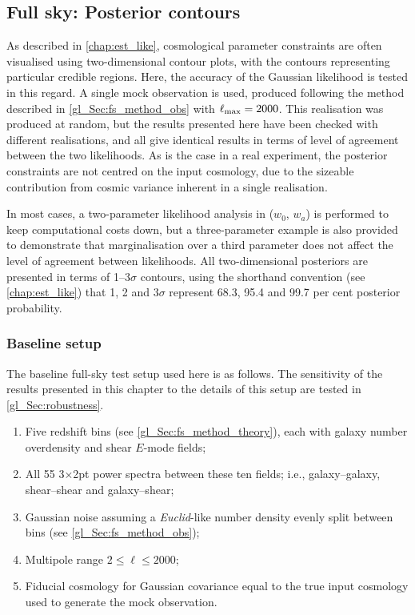 \subsection{Full sky: Posterior contours}
\label{gl_Sec:fs_contours}

As described in \autoref{chap:est_like}, cosmological parameter constraints are often visualised using two-dimensional contour plots, with the contours representing particular credible regions. Here, the accuracy of the Gaussian likelihood is tested in this regard. A single mock observation is used, produced following the method described in \autoref{gl_Sec:fs_method_obs} with $\ell_\text{max} = 2000$. This realisation was produced at random, but the results presented here have been checked with different realisations, and all give identical results in terms of level of agreement between the two likelihoods. As is the case in a real experiment, the posterior constraints are not centred on the input cosmology, due to the sizeable contribution from cosmic variance inherent in a single realisation.

In most cases, a two-parameter likelihood analysis in ($w_0$, $w_a$) is performed to keep computational costs down, but a three-parameter example is also provided to demonstrate that marginalisation over a third parameter does not affect the level of agreement between likelihoods. All two-dimensional posteriors are presented in terms of 1--3$\sigma$ contours, using the shorthand convention (see \autoref{chap:est_like}) that 1, 2 and 3$\sigma$ represent 68.3, 95.4 and 99.7 per cent posterior probability.

\subsubsection{Baseline setup}

The baseline full-sky test setup used here is as follows. The sensitivity of the results presented in this chapter to the details of this setup are tested in \autoref{gl_Sec:robustness}.
\begin{enumerate}
\item Five redshift bins (see \autoref{gl_Sec:fs_method_theory}), each with galaxy number overdensity and shear $E$-mode fields;
\item All 55 3$\times$2pt power spectra between these ten fields; i.e., galaxy--galaxy, shear--shear and galaxy--shear;
\item Gaussian noise assuming a \textit{Euclid}-like number density evenly split between bins (see \autoref{gl_Sec:fs_method_obs});
\item Multipole range $2 \leq \ell \leq 2000$;
\item Fiducial cosmology for Gaussian covariance equal to the true input cosmology used to generate the mock observation.
\end{enumerate}

